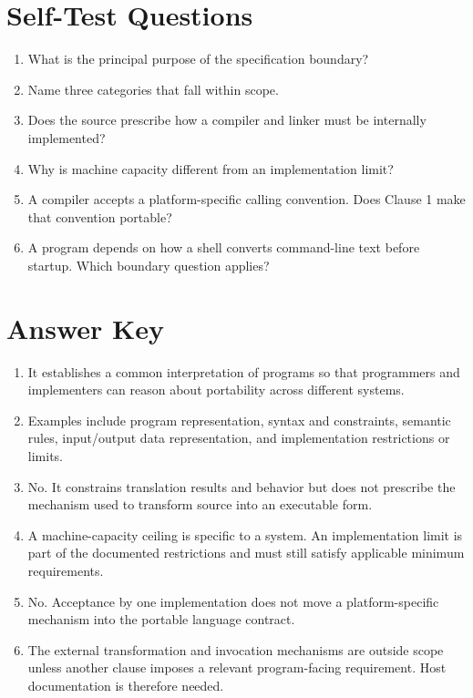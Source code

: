 \documentclass[10pt,letterpaper]{article}
\begin{document}
\section{Self-Test Questions}
\begin{enumerate}
  \item What is the principal purpose of the specification boundary?
  \item Name three categories that fall within scope.
  \item Does the source prescribe how a compiler and linker must be internally implemented?
  \item Why is machine capacity different from an implementation limit?
  \item A compiler accepts a platform-specific calling convention. Does Clause 1 make that convention portable?
  \item A program depends on how a shell converts command-line text before startup. Which boundary question applies?
\end{enumerate}

\clearpage
\section{Answer Key}
\begin{enumerate}
  \item It establishes a common interpretation of programs so that programmers and implementers can reason about portability across different systems.

  \item Examples include program representation, syntax and constraints, semantic rules, input/output data representation, and implementation restrictions or limits.

  \item No. It constrains translation results and behavior but does not prescribe the mechanism used to transform source into an executable form.

  \item A machine-capacity ceiling is specific to a system. An implementation limit is part of the documented restrictions and must still satisfy applicable minimum requirements.

  \item No. Acceptance by one implementation does not move a platform-specific mechanism into the portable language contract.

  \item The external transformation and invocation mechanisms are outside scope unless another clause imposes a relevant program-facing requirement. Host documentation is therefore needed.
\end{enumerate}
\end{document}
